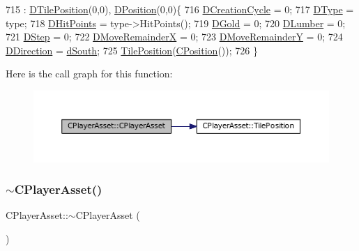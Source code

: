 \begin{DoxyCode}
715                                                                  : \hyperlink{classCPlayerAsset_a5b59a9d3b7db8c7fa194b80dafb96186}{DTilePosition}(0,0), 
      \hyperlink{classCPlayerAsset_aa9f53c009b181c7c5647c6b03776a04c}{DPosition}(0,0)\{
716     \hyperlink{classCPlayerAsset_a8b0efb3ddc27ee11f331ade667bc4b0d}{DCreationCycle} = 0;
717     \hyperlink{classCPlayerAsset_a5d61f73471e1e6f0a6ab15f2ffa7b359}{DType} = type;
718     \hyperlink{classCPlayerAsset_a331750935bf594e665544085fb74e89d}{DHitPoints} = type->HitPoints();
719     \hyperlink{classCPlayerAsset_ab90ebdc73c6794fd44ddbe273f610292}{DGold} = 0;
720     \hyperlink{classCPlayerAsset_af726ea7df9596f02cdb1428d61186349}{DLumber} = 0;
721     \hyperlink{classCPlayerAsset_a7964d2161d51b3edd66fbc9c59eba4b0}{DStep} = 0;
722     \hyperlink{classCPlayerAsset_aa57d93e239e9a80c362949f260471456}{DMoveRemainderX} = 0;
723     \hyperlink{classCPlayerAsset_a282502fea7d02e38aa40a538a9c1565e}{DMoveRemainderY} = 0;
724     \hyperlink{classCPlayerAsset_a2f07e280268d0402220c583d1029d683}{DDirection} = \hyperlink{GameDataTypes_8h_acb2b033915f6659a71a38b5aa6e4eb42ab97d9c3d0f527d3f74de60cc1889ecd0}{dSouth};
725     \hyperlink{classCPlayerAsset_a23354232e5585574bc8e12c1fdb37ad9}{TilePosition}(\hyperlink{classCPosition}{CPosition}());
726 \}
\end{DoxyCode}
Here is the call graph for this function\+:
\nopagebreak
\begin{figure}[H]
\begin{center}
\leavevmode
\includegraphics[width=350pt]{classCPlayerAsset_a84787ab2502e70d52c5b73b51ba9063a_cgraph}
\end{center}
\end{figure}
\hypertarget{classCPlayerAsset_a5dbb83d6431454644f98d46c6348dfb8}{}\label{classCPlayerAsset_a5dbb83d6431454644f98d46c6348dfb8} 
\subsubsection{\texorpdfstring{$\sim$\+C\+Player\+Asset()}{~CPlayerAsset()}}
{\footnotesize\ttfamily C\+Player\+Asset\+::$\sim$\+C\+Player\+Asset (\begin{DoxyParamCaption}{ }\end{DoxyParamCaption})}



